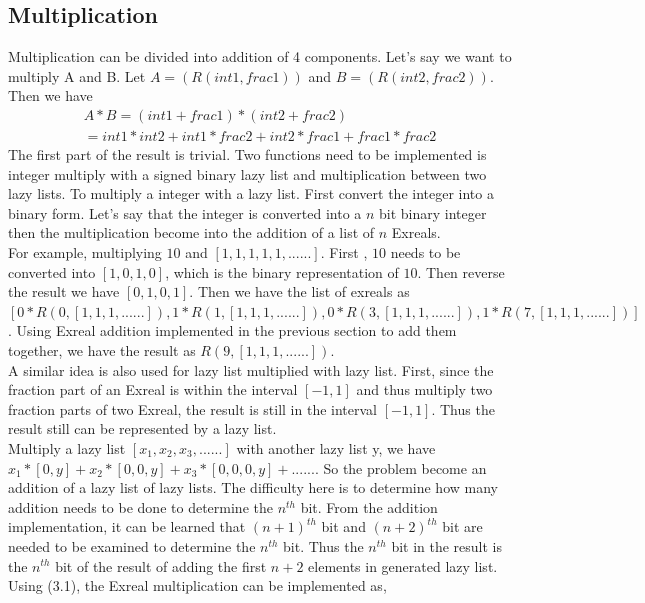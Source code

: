 \documentclass[12pt,twoside,notitlepage]{report}
\begin{document}
\subsection{Multiplication}
Multiplication can be divided into addition of 4 components. Let's say we want to multiply A and B. Let $A=(R(int1,frac1))$ and $B=(R(int2,frac2))$. Then we have 
\begin{equation}
\begin{split}
A*B=(int1+frac1)*(int2+frac2)\\
=int1*int2+int1*frac2+int2*frac1+frac1*frac2
\end{split}
\end{equation}
The first part of the result is trivial. Two functions need to be implemented is integer multiply with a signed binary lazy list and multiplication between two lazy lists.
To multiply a integer with a lazy list. First convert the integer into a binary form. Let's say that the integer is converted into a $n$ bit binary integer then the multiplication become into the addition of a list of $n$ Exreals. \\
For example, multiplying $10$ and $[1,1,1,1,1,......]$. First , $10$ needs to be converted into $[1,0,1,0]$, which is the binary representation of $10$. Then reverse the result we have $[0,1,0,1]$. Then we have the list of exreals as $[0*R(0,[1,1,1,......]), 1*R(1,[1,1,1,......]), 0*R(3,[1,1,1,......]), 1*R(7,[1,1,1,......])]$. Using Exreal addition implemented in the previous section to add them together, we have the result as $R(9,[1,1,1,......])$.\\
A similar idea is also used for lazy list multiplied with lazy list. First, since the fraction part of an Exreal is within the interval $[-1,1]$ and thus multiply two fraction parts of two Exreal, the result is still in the interval $[-1,1]$. Thus the result still can be represented by a lazy list. \\
Multiply a lazy list $[x_1,x_2,x_3,......]$ with another lazy list y, we have $x_1*[0,y] +x_2*[0,0,y]+x_3* [0,0,0,y]+......$. So the problem become an addition of a lazy list of lazy lists. The difficulty here is to determine how many addition needs to be done to determine the $n^{th}$ bit. From the addition implementation, it can be learned that $(n+1)^{th}$ bit and $(n+2)^{th}$ bit are needed to be examined to determine the $n^{th}$ bit. Thus the $n^{th}$ bit in the result is the $n^{th}$ bit of the result of adding the first $n+2$ elements in generated lazy list.\\
Using (3.1), the Exreal multiplication can be implemented as,
\end{document}
